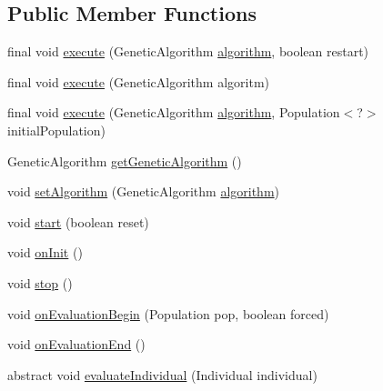 \subsection*{Public Member Functions}
\begin{DoxyCompactItemize}
\item 
final void \hyperlink{classjenes_1_1utils_1_1multitasking_1_1_runner_a24d074cbd5140cd8bc65623fa1961f39}{execute} (Genetic\-Algorithm \hyperlink{classjenes_1_1utils_1_1multitasking_1_1_runner_a699ccf526b6116f97abc09e4ce390c89}{algorithm}, boolean restart)
\item 
final void \hyperlink{classjenes_1_1utils_1_1multitasking_1_1_runner_ae222d69f44508fc432c05074272e0ae3}{execute} (Genetic\-Algorithm algoritm)
\item 
final void \hyperlink{classjenes_1_1utils_1_1multitasking_1_1_runner_a7205f2d93d68f40e3e87dccf92cc3720}{execute} (Genetic\-Algorithm \hyperlink{classjenes_1_1utils_1_1multitasking_1_1_runner_a699ccf526b6116f97abc09e4ce390c89}{algorithm}, Population$<$?$>$ initial\-Population)
\item 
Genetic\-Algorithm \hyperlink{classjenes_1_1utils_1_1multitasking_1_1_runner_a462a121a840bbf06593bbd7da219d8b9}{get\-Genetic\-Algorithm} ()
\item 
void \hyperlink{classjenes_1_1utils_1_1multitasking_1_1_runner_adad9fb400d736e55bcd3dfdf07742437}{set\-Algorithm} (Genetic\-Algorithm \hyperlink{classjenes_1_1utils_1_1multitasking_1_1_runner_a699ccf526b6116f97abc09e4ce390c89}{algorithm})
\item 
void \hyperlink{classjenes_1_1utils_1_1multitasking_1_1_runner_a5dc1ed49495150ff26ec5194010b00e4}{start} (boolean reset)
\item 
void \hyperlink{classjenes_1_1utils_1_1multitasking_1_1_runner_a4c4d4a0cd7aec110d60da5c660903398}{on\-Init} ()
\item 
void \hyperlink{classjenes_1_1utils_1_1multitasking_1_1_runner_ac89e8ac54daba2e326e687662ff9f7b0}{stop} ()
\item 
void \hyperlink{classjenes_1_1utils_1_1multitasking_1_1_runner_a6ec13cf0fb2ff03461a3a397421505cf}{on\-Evaluation\-Begin} (Population pop, boolean forced)
\item 
void \hyperlink{classjenes_1_1utils_1_1multitasking_1_1_runner_a82c84ad942296d62849248b107ec3a2c}{on\-Evaluation\-End} ()
\item 
abstract void \hyperlink{classjenes_1_1utils_1_1multitasking_1_1_runner_a250c5e0ffdb86ef0bb0e78e625a449e7}{evaluate\-Individual} (Individual individual)
\end{DoxyCompactItemize}
